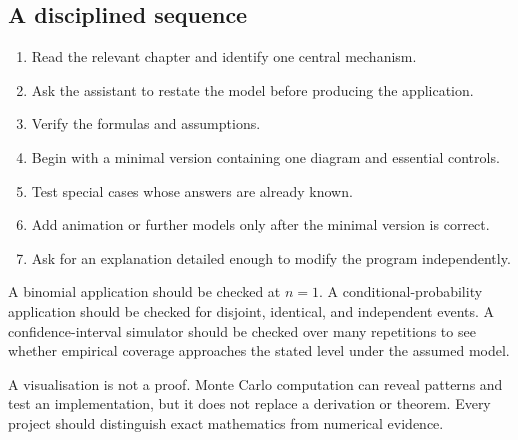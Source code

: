\subsection*{A disciplined sequence}

\begin{enumerate}
    \item Read the relevant chapter and identify one central mechanism.
    \item Ask the assistant to restate the model before producing the application.
    \item Verify the formulas and assumptions.
    \item Begin with a minimal version containing one diagram and essential controls.
    \item Test special cases whose answers are already known.
    \item Add animation or further models only after the minimal version is correct.
    \item Ask for an explanation detailed enough to modify the program independently.
\end{enumerate}

A binomial application should be checked at \(n=1\). A conditional-probability application should be checked for disjoint, identical, and independent events. A confidence-interval simulator should be checked over many repetitions to see whether empirical coverage approaches the stated level under the assumed model.

\begin{remarkbox}
A visualisation is not a proof. Monte Carlo computation can reveal patterns and test an implementation, but it does not replace a derivation or theorem. Every project should distinguish exact mathematics from numerical evidence.
\end{remarkbox}
